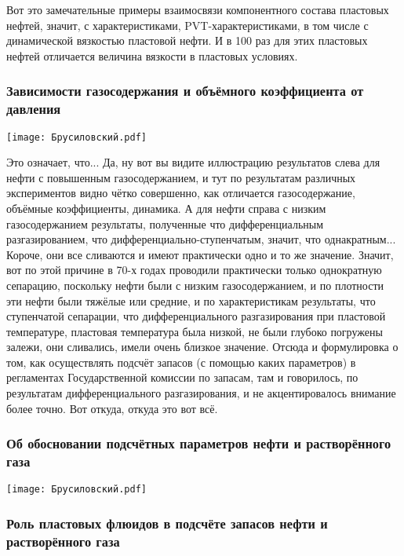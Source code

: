 \documentclass[main.tex]{subfiles}
\begin{document}
Вот это замечательные примеры взаимосвязи компонентного состава пластовых нефтей, значит, с характеристиками, PVT-характеристиками, в том числе с динамической вязкостью пластовой нефти.
И в 100 раз для этих пластовых нефтей отличается величина вязкости в пластовых условиях.

\subsubsection{Зависимости газосодержания и объёмного коэффициента от давления}

\begin{center}
\texttt{[image: Брусиловский.pdf]}
\end{center}

Это означает, что...
Да, ну вот вы видите иллюстрацию результатов слева для нефти с повышенным газосодержанием, и тут по результатам различных экспериментов видно чётко совершенно, как отличается газосодержание, объёмные коэффициенты, динамика.
А для нефти справа с низким газосодержанием результаты, полученные что дифференциальным разгазированием, что дифференциально-ступенчатым, значит, что однакратным...
Короче, они все сливаются и имеют практически одно и то же значение.
Значит, вот по этой причине в 70-х годах проводили практически только однократную сепарацию, поскольку нефти были с низким газосодержанием, и по плотности эти нефти были тяжёлые или средние, и по характеристикам результаты, что ступенчатой сепарации, что дифференциального разгазирования при пластовой температуре, пластовая температура была низкой, не были глубоко погружены залежи, они сливались, имели очень близкое значение.
Отсюда и формулировка о том, как осуществлять подсчёт запасов (с помощью каких параметров) в регламентах Государственной комиссии по запасам, там и говорилось, по результатам дифференциального разгазирования, и не акцентировалось внимание более точно.
Вот откуда, откуда это вот всё.

\subsubsection{Об обосновании подсчётных параметров нефти и растворённого газа}

\begin{center}
\texttt{[image: Брусиловский.pdf]}
\end{center}



\subsubsection{Роль пластовых флюидов в подсчёте запасов нефти и растворённого газа}
\end{document}
